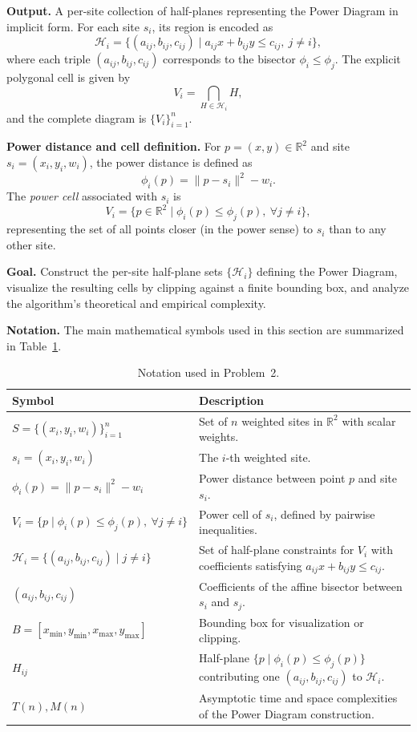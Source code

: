 \documentclass{article}
\begin{document}
\textbf{Output.}  
A per-site collection of half-planes representing the Power Diagram in implicit form.  
For each site $s_i$, its region is encoded as
\[
\mathcal{H}_i = \{(a_{ij}, b_{ij}, c_{ij}) \mid a_{ij}x + b_{ij}y \le c_{ij},\ j \neq i\},
\]
where each triple $(a_{ij}, b_{ij}, c_{ij})$ corresponds to the bisector $\phi_i \le \phi_j$.  
The explicit polygonal cell is given by
\[
V_i = \bigcap_{H \in \mathcal{H}_i} H,
\]
and the complete diagram is $\{V_i\}_{i=1}^n$.

\textbf{Power distance and cell definition.}  
For $p=(x,y)\in\mathbb{R}^2$ and site $s_i=(x_i,y_i,w_i)$, the power distance is defined as
\[
\phi_i(p) = \|p - s_i\|^2 - w_i .
\]
The \emph{power cell} associated with $s_i$ is
\[
V_i = \{p \in \mathbb{R}^2 \mid \phi_i(p) \le \phi_j(p),\ \forall j \ne i\},
\]
representing the set of all points closer (in the power sense) to $s_i$ than to any other site.

\textbf{Goal.}  
Construct the per-site half-plane sets $\{\mathcal{H}_i\}$ defining the Power Diagram, visualize the resulting cells by clipping against a finite bounding box, and analyze the algorithm’s theoretical and empirical complexity.

\textbf{Notation.}  
The main mathematical symbols used in this section are summarized in Table~\ref{tab:notation2}.

\begin{table}[H]
\centering
\caption{Notation used in Problem~2.}
\label{tab:notation2}
\renewcommand{\arraystretch}{1.1}
\begin{tabular}{p{5.0cm} p{8.3cm}}
\hline
\textbf{Symbol} & \textbf{Description} \\
\hline
$S = \{(x_i, y_i, w_i)\}_{i=1}^n$ & Set of $n$ weighted sites in $\mathbb{R}^2$ with scalar weights. \\[2pt]
$s_i = (x_i, y_i, w_i)$ & The $i$-th weighted site. \\[2pt]
$\phi_i(p) = \|p - s_i\|^2 - w_i$ & Power distance between point $p$ and site $s_i$. \\[2pt]
$V_i = \{p \mid \phi_i(p) \le \phi_j(p),\ \forall j \ne i\}$ & Power cell of $s_i$, defined by pairwise inequalities. \\[2pt]
$\mathcal{H}_i = \{(a_{ij}, b_{ij}, c_{ij}) \mid j \ne i\}$ & Set of half-plane constraints for $V_i$ with coefficients satisfying $a_{ij}x + b_{ij}y \le c_{ij}$. \\[2pt]
$(a_{ij}, b_{ij}, c_{ij})$ & Coefficients of the affine bisector between $s_i$ and $s_j$. \\[2pt]
$B = [x_{\min}, y_{\min}, x_{\max}, y_{\max}]$ & Bounding box for visualization or clipping. \\[2pt]
$H_{ij}$ & Half-plane $\{p \mid \phi_i(p) \le \phi_j(p)\}$ contributing one $(a_{ij}, b_{ij}, c_{ij})$ to $\mathcal{H}_i$. \\[2pt]
$T(n), M(n)$ & Asymptotic time and space complexities of the Power Diagram construction. \\
\hline
\end{tabular}
\end{table}
\end{document}
